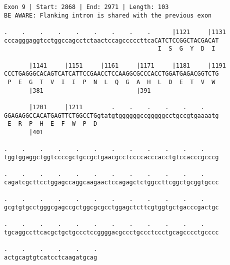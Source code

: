 \documentclass{article}
\begin{document}
\newpage
\begin{Verbatim}[fontfamily=courier]
Exon 9 | Start: 2868 | End: 2971 | Length: 103
BE AWARE: Flanking intron is shared with the previous exon

.    .    .    .    .    .    .    .    .      |1121     |1131
cccagggaggtcctggccagcctctaactccagcccccttcaCATCTCCGGCTACGACAT
                                           I  S  G  Y  D  I 

       |1141     |1151     |1161     |1171     |1181     |1191
CCCTGAGGGCACAGTCATCATTCCGAACCTCCAAGGCGCCCACCTGGATGAGACGGTCTG
 P  E  G  T  V  I  I  P  N  L  Q  G  A  H  L  D  E  T  V  W 
       |381                          |391                   

       |1201     |1211        .    .    .    .    .    .    
GGAGAGGCCACATGAGTTCTGGCCTGgtatgtggggggccgggggcctgccgtgaaaatg
 E  R  P  H  E  F  W  P  D                                  
       |401                                                 

.    .    .    .    .    .    .    .    .    .    .    .    
tggtggaggctggtccccgctgccgctgaacgcctccccacccacctgtccacccgcccg

.    .    .    .    .    .    .    .    .    .    .    .    
cagatcgcttcctggagccaggcaagaactccagagctctggccttcggctgcggtgccc

.    .    .    .    .    .    .    .    .    .    .    .    
gcgtgtgcctgggcgagccgctggcgcgcctggagctcttcgtggtgctgacccgactgc

.    .    .    .    .    .    .    .    .    .    .    .    
tgcaggccttcacgctgctgccctccggggacgccctgccctccctgcagcccctgcccc

.    .    .    .    .    .
actgcagtgtcatcctcaagatgcag
\end{Verbatim}
\newpage
\end{document}
